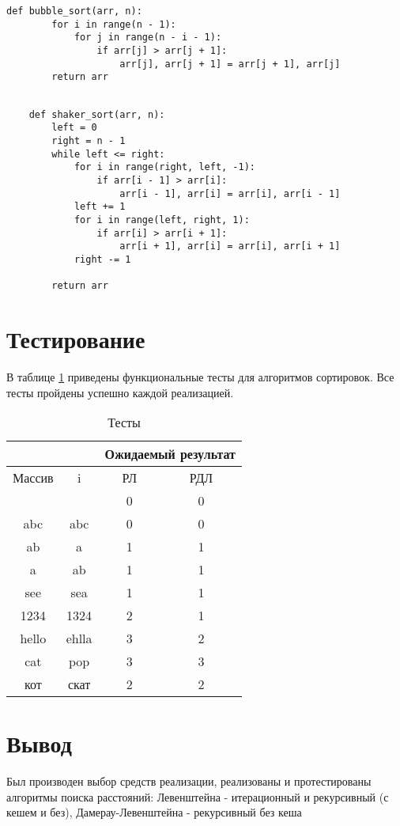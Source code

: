 \begin{lstlisting}[caption=Реализация алгоритма сортировки пузырьком,
	label={bubble_list}]
	def bubble_sort(arr, n):
		for i in range(n - 1):
			for j in range(n - i - 1):
				if arr[j] > arr[j + 1]:
					arr[j], arr[j + 1] = arr[j + 1], arr[j]
		return arr
\end{lstlisting}

\begin{lstlisting}[caption=Реализация алгоритма шейкерной сортировки,
	label={shaker_sort}]

	def shaker_sort(arr, n):
		left = 0
		right = n - 1
		while left <= right:
			for i in range(right, left, -1):
				if arr[i - 1] > arr[i]:
					arr[i - 1], arr[i] = arr[i], arr[i - 1]
			left += 1
			for i in range(left, right, 1):
				if arr[i] > arr[i + 1]:
					arr[i + 1], arr[i] = arr[i], arr[i + 1]
			right -= 1
		
		return arr
\end{lstlisting}

\section{Тестирование}

В таблице \ref{test} приведены функциональные тесты для алгоритмов сортировок. Все тесты пройдены успешно каждой реализацией.

\begin{table}[h]
	\begin{center}
		\caption{\label{test} Тесты}
		\begin{tabular}{|c|c|c|c|}
			\hline
			&                    & \multicolumn{2}{c|}{\bfseries Ожидаемый результат}    \\ \cline{2-3-4}\hline
			Массив & i & РЛ & РДЛ \\ [0.5ex] 
			\hline
			 &  & 0 & 0\\
			\hline
			abc & abc & 0 & 0\\
			\hline
			ab & a & 1 & 1\\
			\hline
			a & ab & 1 & 1\\
			\hline
			see & sea & 1 & 1\\
			\hline
			1234 & 1324 & 2 & 1\\
			\hline
			hello & ehlla & 3 & 2\\
			\hline
			cat & pop & 3 & 3\\
			\hline
			кот & скат & 2 & 2\\
			\hline
		\end{tabular}
	\end{center}
\end{table}


\section*{Вывод}

Был производен выбор средств реализации, реализованы и протестированы алгоритмы поиска расстояний: Левенштейна - итерационный и рекурсивный (с кешем и без), Дамерау-Левенштейна - рекурсивный без кеша
